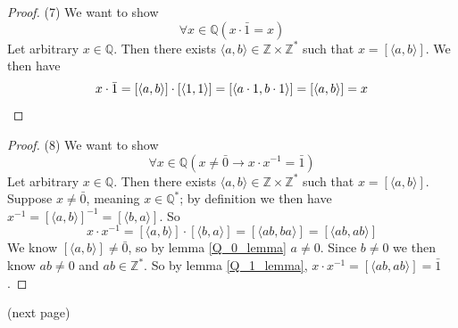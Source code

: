 \documentclass{report}
\begin{document}
\begin{proof}(7)
We want to show
\begin{equation*}
\forall x\in\mathbb Q(x\cdot\bar1=x)
\end{equation*}
Let arbitrary $x\in\mathbb Q$. Then there exists $\langle a,b\rangle\in\mathbb Z\times\mathbb Z^*$ such that 
$x=[\langle a,b\rangle]$. We then have
\begin{equation*}
x\cdot\bar1=[\langle a,b\rangle]\cdot[\langle 1,1\rangle]=[\langle a\cdot1,b\cdot1\rangle]=[\langle a,b\rangle]=x\qedhere
\end{equation*}
\end{proof}
\begin{proof}(8)
We want to show
\begin{equation*}
\forall x\in\mathbb Q(x\neq\bar0\to x\cdot x^{-1}=\bar1)
\end{equation*}
Let arbitrary $x\in\mathbb Q$. Then there exists $\langle a,b\rangle\in\mathbb Z\times\mathbb Z^*$ such that 
$x=[\langle a,b\rangle]$. Suppose $x\neq\bar0$, meaning $x\in\mathbb Q^*$; by definition we then have $x^{-1}=[\langle a,b\rangle]^{-1}=[\langle b,a\rangle]$. So
\begin{equation*}
x\cdot x^{-1}=[\langle a,b\rangle]\cdot[\langle b,a\rangle]=[\langle ab,ba\rangle]=[\langle ab,ab\rangle]
\end{equation*}
We know $[\langle a,b\rangle]\neq\bar0$, so by lemma \ref{Q_0_lemma} $a\neq0$. Since $b\neq0$ we then know $ab\neq0$ and $ab\in\mathbb Z^*$. 
So by lemma \ref{Q_1_lemma}, $x\cdot x^{-1}=[\langle ab,ab\rangle]=\bar1$.
\end{proof}
\noindent(next page)\newpage
\end{document}
